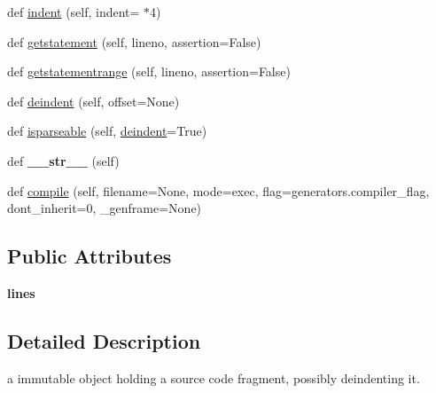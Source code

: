 \begin{DoxyCompactItemize}
\item 
def \hyperlink{classpy_1_1__code_1_1source_1_1_source_ae22bab7210f429aa4bd5dcc862169673}{indent} (self, indent=\textquotesingle{} \textquotesingle{} $\ast$4)
\item 
def \hyperlink{classpy_1_1__code_1_1source_1_1_source_aa21e0a21d02287db4a00be9f35a8fd40}{getstatement} (self, lineno, assertion=False)
\item 
def \hyperlink{classpy_1_1__code_1_1source_1_1_source_a957302d50eeb4bda3d0a231e95b92066}{getstatementrange} (self, lineno, assertion=False)
\item 
def \hyperlink{classpy_1_1__code_1_1source_1_1_source_a523b7291071984a47617c6c3329d2332}{deindent} (self, offset=None)
\item 
def \hyperlink{classpy_1_1__code_1_1source_1_1_source_a0512b77cc19bbbf387c55eafe89b39bf}{isparseable} (self, \hyperlink{classpy_1_1__code_1_1source_1_1_source_a523b7291071984a47617c6c3329d2332}{deindent}=True)
\item 
\mbox{\label{classpy_1_1__code_1_1source_1_1_source_a20d6791e021412a3c00d41d1f1977669}} 
def {\bfseries \+\_\+\+\_\+str\+\_\+\+\_\+} (self)
\item 
def \hyperlink{classpy_1_1__code_1_1source_1_1_source_a48b92e89ad7873f768254dadd10092c4}{compile} (self, filename=None, mode=\textquotesingle{}exec\textquotesingle{}, flag=generators.\+compiler\+\_\+flag, dont\+\_\+inherit=0, \+\_\+genframe=None)
\end{DoxyCompactItemize}
\subsection*{Public Attributes}
\begin{DoxyCompactItemize}
\item 
\mbox{\label{classpy_1_1__code_1_1source_1_1_source_a2b7a1d7dd53552fa324a7e4d658d1185}} 
{\bfseries lines}
\end{DoxyCompactItemize}


\subsection{Detailed Description}
\begin{DoxyVerb}a immutable object holding a source code fragment,
    possibly deindenting it.
\end{DoxyVerb}
 

